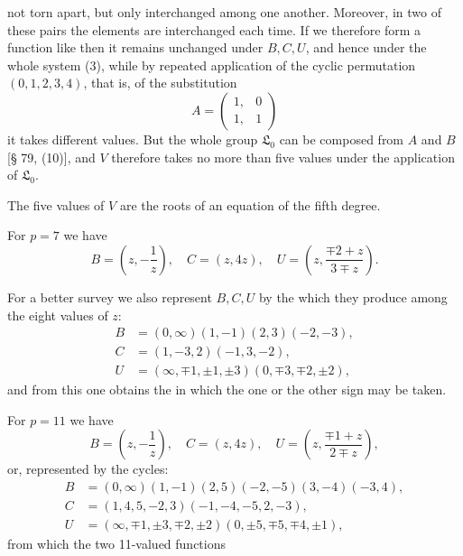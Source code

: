 
not torn apart, but only interchanged among one another. Moreover, in two of these pairs the elements are interchanged each time. If we therefore form a function like
then it remains unchanged under $B, C, U$, and hence under the whole system (3), while by repeated application of the cyclic permutation $(0, 1, 2, 3, 4)$, that is, of the substitution
\[
A = \begin{pmatrix} 1, & 0 \\ 1, & 1 \end{pmatrix}
\]
it takes  different values. But the whole group $\mathfrak{L}_0$ can be composed from $A$ and $B$ [§ 79, (10)], and $V$ therefore takes no more than five values under the application of $\mathfrak{L}_0$.

The five values of $V$ are the roots of an equation of the fifth degree.

For $p = 7$ we have
\[
B = \left(z, -\frac{1}{z}\right), \quad C = (z, 4z), \quad U = \left(z, \frac{\mp 2 + z}{3 \mp z}\right).
\]

For a better survey we also represent $B, C, U$ by the  which they produce among the eight values of $z$:
\[
\begin{aligned}
B &= (0, \infty)(1, -1)(2, 3)(-2, -3), \\
C &= (1, -3, 2)(-1, 3, -2), \\
U &= (\infty, \mp 1, \pm 1, \pm 3)(0, \mp 3, \mp 2, \pm 2),
\end{aligned}
\]
and from this one obtains the 
in which the one or the other sign may be taken.

For $p = 11$ we have
\[
B = \left(z, -\frac{1}{z}\right), \quad C = (z, 4z), \quad U = \left(z, \frac{\mp 1 + z}{2 \mp z}\right),
\]
or, represented by the cycles:
\[
\begin{aligned}
B &= (0, \infty)(1, -1)(2, 5)(-2, -5)(3, -4)(-3, 4), \\
C &= (1, 4, 5, -2, 3)(-1, -4, -5, 2, -3), \\
U &= (\infty, \mp 1, \pm 3, \mp 2, \pm 2)(0, \pm 5, \mp 5, \mp 4, \pm 1),
\end{aligned}
\]
from which the two 11-valued functions
